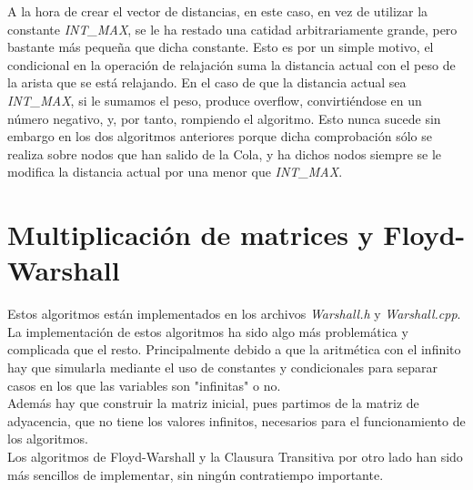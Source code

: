A la hora de crear el vector de distancias, en este caso, en vez de utilizar la constante \textit{INT\_MAX}, se le ha restado una catidad arbitrariamente grande, pero bastante más pequeña que dicha constante. Esto es por un simple motivo, el condicional en la operación de relajación suma la distancia actual con el peso de la arista que se está relajando. En el caso de que la distancia actual sea \textit{INT\_MAX}, si le sumamos el peso, produce overflow, convirtiéndose en un número negativo, y, por tanto, rompiendo el algoritmo. Esto nunca sucede sin embargo en los dos algoritmos anteriores porque dicha comprobación sólo se realiza sobre nodos que han salido de la Cola, y ha dichos nodos siempre se le modifica la distancia actual por una menor que \textit{INT\_MAX}.

\section{Multiplicación de matrices y Floyd-Warshall}

Estos algoritmos están implementados en los archivos \textit{Warshall.h} y \textit{Warshall.cpp}. La implementación de estos algoritmos ha sido algo más problemática y complicada que el resto. Principalmente debido a que la aritmética con el infinito hay que simularla mediante el uso de constantes y condicionales para separar casos en los que las variables son "infinitas" o no. \\

Además hay que construir la matriz inicial, pues partimos de la matriz de adyacencia, que no tiene los valores infinitos, necesarios para el funcionamiento de los algoritmos. \\

Los algoritmos de Floyd-Warshall y la Clausura Transitiva por otro lado han sido más sencillos de implementar, sin ningún contratiempo importante.

\endinput



